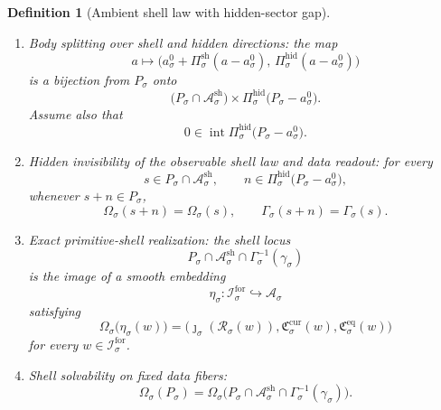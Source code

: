 \documentclass[11pt]{article}
\newcommand{\ForSpace}[1]{\mathcal I_{#1}^{\mathrm{for}}}
\newcommand{\Reduction}[1]{\mathcal R_{#1}}
\newcommand{\CurrentCarrier}[1]{\mathfrak C_{#1}^{\mathrm{cur}}}
\newcommand{\EqCarrier}[1]{\mathfrak C_{#1}^{\mathrm{eq}}}
\newcommand{\AmbientSpace}[1]{\mathcal A_{#1}}
\newcommand{\AmbientBody}[1]{P_{#1}}
\newcommand{\AmbientRead}[1]{\Omega_{#1}}
\newcommand{\AmbientShellLaw}[1]{\Gamma_{#1}}
\newcommand{\AmbientValue}[1]{\gamma_{#1}}
\newcommand{\ShellAffine}[1]{\mathcal A_{#1}^{\mathrm{sh}}}
\newcommand{\ShellProj}[1]{\Pi_{#1}^{\mathrm{sh}}}
\newcommand{\HiddenProj}[1]{\Pi_{#1}^{\mathrm{hid}}}
\newcommand{\AmbientEmbed}[1]{\eta_{#1}}
\newcommand{\AmbientRef}[1]{a_{#1}^{0}}
\newtheorem{definition}{Definition}
\begin{document}
\begin{definition}[Ambient shell law with hidden-sector gap]
\begin{enumerate}
    \item Body splitting over shell and hidden directions: the map
    \begin{equation}
    a\longmapsto
    \bigl(
    \AmbientRef{\sigma}+\ShellProj{\sigma}(a-\AmbientRef{\sigma}),
    \,
    \HiddenProj{\sigma}(a-\AmbientRef{\sigma})
    \bigr)
    \label{eq:splitmap}
    \end{equation}
    is a bijection from \(\AmbientBody{\sigma}\) onto
    \[
    \bigl(\AmbientBody{\sigma}\cap \ShellAffine{\sigma}\bigr)
    \times
    \HiddenProj{\sigma}\bigl(\AmbientBody{\sigma}-\AmbientRef{\sigma}\bigr).
    \]
    Assume also that
    \[
    0\in
    \operatorname{int}
    \HiddenProj{\sigma}\bigl(\AmbientBody{\sigma}-\AmbientRef{\sigma}\bigr).
    \]
    \item Hidden invisibility of the observable shell law and data readout: for every
    \[
    s\in \AmbientBody{\sigma}\cap \ShellAffine{\sigma},
    \qquad
    n\in \HiddenProj{\sigma}\bigl(\AmbientBody{\sigma}-\AmbientRef{\sigma}\bigr),
    \]
    whenever \(s+n\in\AmbientBody{\sigma}\),
    \begin{equation}
    \AmbientRead{\sigma}(s+n)=\AmbientRead{\sigma}(s),
    \qquad
    \AmbientShellLaw{\sigma}(s+n)=\AmbientShellLaw{\sigma}(s).
    \label{eq:hiddeninvisible}
    \end{equation}
    \item Exact primitive-shell realization: the shell locus
    \[
    \AmbientBody{\sigma}\cap
    \ShellAffine{\sigma}\cap
    \AmbientShellLaw{\sigma}^{-1}(\AmbientValue{\sigma})
    \]
    is the image of a smooth embedding
    \[
    \AmbientEmbed{\sigma}:\ForSpace{\sigma}\hookrightarrow \AmbientSpace{\sigma}
    \]
    satisfying
    \begin{equation}
    \AmbientRead{\sigma}\bigl(\AmbientEmbed{\sigma}(w)\bigr)
    =
    \bigl(
    \jmath_{\sigma}(\Reduction{\sigma}(w)),
    \CurrentCarrier{\sigma}(w),
    \EqCarrier{\sigma}(w)
    \bigr)
    \label{eq:ambientcompat}
    \end{equation}
    for every \(w\in\ForSpace{\sigma}\).
    \item Shell solvability on fixed data fibers:
    \begin{equation}
    \AmbientRead{\sigma}(\AmbientBody{\sigma})
    =
    \AmbientRead{\sigma}
    \bigl(
    \AmbientBody{\sigma}\cap
    \ShellAffine{\sigma}\cap
    \AmbientShellLaw{\sigma}^{-1}(\AmbientValue{\sigma})
    \bigr).
    \label{eq:ambientsolvability}
    \end{equation}

\end{enumerate}
\end{definition}
\end{document}

